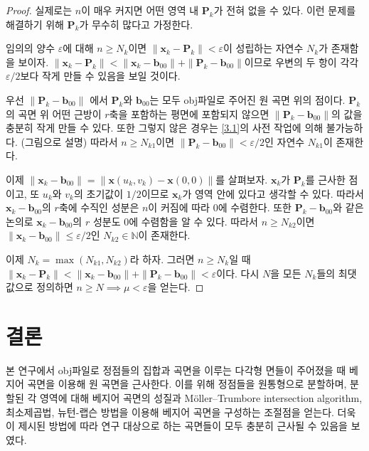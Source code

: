 \documentclass[10pt]{gshs-report-v2.0}
\theoremstyle{theorem}
\theoremstyle{lemma}
\theoremstyle{definition}
\begin{document}
\begin{proof}
	실제로는 $n$이 매우 커지면 어떤 영역 내 $\mathbf{P}_k$가 전혀 없을 수 있다. 이런 문제를 해결하기 위해 $\mathbf{P}_k$가 무수히 많다고 가정한다. 
	
	임의의 양수 $\varepsilon$에 대해 $n \geq N_k$이면 $\| \mathbf{x}_k-\mathbf{P}_k \| < \varepsilon$이 성립하는 자연수 $N_k$가 존재함을 보이자. $\| \mathbf{x}_k-\mathbf{P}_k \| < \| \mathbf{x}_k-\mathbf{b}_{00} \| + \| \mathbf{P}_k-\mathbf{b}_{00} \|$이므로 우변의 두 항이 각각 $\varepsilon/2$보다 작게 만들 수 있음을 보일 것이다. 
	
	우선 $\| \mathbf{P}_k - \mathbf{b}_{00} \|$ 에서 $\mathbf{P}_k$와 $\mathbf{b}_{00}$는 모두 obj파일로 주어진 원 곡면 위의 점이다. $\mathbf{P}_k$의 곡면 위 어떤 근방이 $r$축을 포함하는 평면에 포함되지 않으면 $\| \mathbf{P}_k - \mathbf{b}_{00} \|$의 값을 충분히 작게 만들 수 있다. 또한 그렇지 않은 경우는 \cref{3.1}의 사전 작업에 의해 불가능하다. (그림으로 설명) 따라서 $n \geq N_{k1}$이면 $\| \mathbf{P}_k - \mathbf{b}_{00} \| < \varepsilon/2$인 자연수 $N_{k1}$이 존재한다.
	
	이제 $\| \mathbf{x}_k-\mathbf{b}_{00} \| = \| \mathbf{x}(u_k, v_k) - \mathbf{x}(0, 0) \|$를 살펴보자. $\mathbf{x}_k$가 $\mathbf{P}_k$를 근사한 점이고, 또 $u_k$와 $v_k$의 초기값이 $1/2$이므로 $\mathbf{x}_k$가 영역 안에 있다고 생각할 수 있다. 따라서 $\mathbf{x}_k-\mathbf{b}_{00}$의 $r$축에 수직인 성분은 $n$이 커짐에 따라 $0$에 수렴한다. 또한  $\mathbf{P}_k-\mathbf{b}_{00}$와 같은 논의로 $\mathbf{x}_k-\mathbf{b}_{00}$의 $r$ 성분도 0에 수렴함을 알 수 있다. 따라서 $n \geq N_{k2}$이면 $\| \mathbf{x}_k - \mathbf{b}_{00} \| \leq \varepsilon/2$인 $N_{k2} \in \mathbb{N}$이 존재한다. 
	
	이제 $N_k=\max(N_{k1}, N_{k2})$라 하자. 그러면 $n\geq N_k$일 때 $\| \mathbf{x}_k-\mathbf{P}_k \| < \| \mathbf{x}_k-\mathbf{b}_{00} \| + \| \mathbf{P}_k-\mathbf{b}_{00} \| < \varepsilon$이다. 다시 $N$을 모든 $N_k$들의 최댓값으로 정의하면 $n \geq N \implies \mu < \varepsilon$을 얻는다. 
\end{proof}

\section{결론}
본 연구에서 obj파일로 정점들의 집합과 곡면을 이루는 다각형 면들이 주어졌을 때 베지어 곡면을 이용해 원 곡면을 근사한다. 이를 위해 정점들을 원통형으로 분할하며, 분할된 각 영역에 대해 베지어 곡면의 성질과 Möller–Trumbore intersection algorithm, 최소제곱법, 뉴턴-랩슨 방법을 이용해 베지어 곡면을 구성하는 조절점을 얻는다. 더욱이 제시된 방법에 따라 연구 대상으로 하는 곡면들이 모두 충분히 근사될 수 있음을 보였다. 
\end{document}
